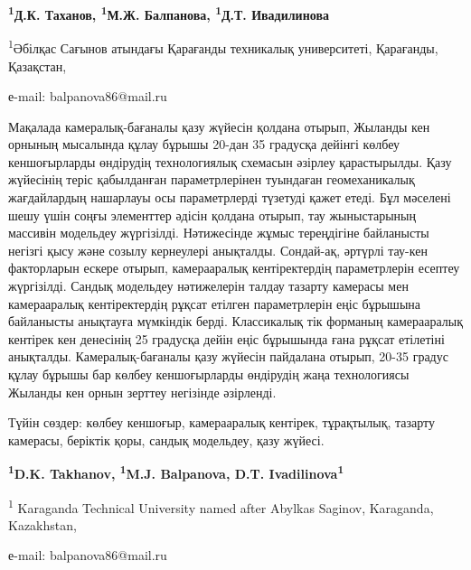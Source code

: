 \begin{center}
{\bfseries \textsuperscript{1}Д.К. Таханов, \textsuperscript{1}М.Ж.
Балпанова\envelope, \textsuperscript{1}Д.Т. Ивадилинова}

\textsuperscript{1}Әбілқас Сағынов атындағы Қарағанды техникалық
университеті, Қарағанды, Қазақстан,

е-mail: balpanova86@mail.ru
\end{center}

Мақалада камералық-бағаналы қазу жүйесін қолдана отырып, Жыланды кен
орнының мысалында құлау бұрышы 20-дан 35 градусқа дейінгі көлбеу
кеншоғырларды өндірудің технологиялық схемасын әзірлеу қарастырылды.
Қазу жүйесінің теріс қабылданған параметрлерінен туындаған
геомеханикалық жағдайлардың нашарлауы осы параметрлерді түзетуді қажет
етеді. Бұл мәселені шешу үшін соңғы элементтер әдісін қолдана отырып,
тау жыныстарының массивін модельдеу жүргізілді. Нәтижесінде жұмыс
тереңдігіне байланысты негізгі қысу және созылу кернеулері анықталды.
Сондай-ақ, әртүрлі тау-кен факторларын ескере отырып, камерааралық
кентіректердің параметрлерін есептеу жүргізілді. Сандық модельдеу
нәтижелерін талдау тазарту камерасы мен камерааралық кентіректердің
рұқсат етілген параметрлерін еңіс бұрышына байланысты анықтауға
мүмкіндік берді. Классикалық тік форманың камерааралық кентірек кен
денесінің 25 градусқа дейін еңіс бұрышында ғана рұқсат етілетіні
анықталды. Камералық-бағаналы қазу жүйесін пайдалана отырып, 20-35
градус құлау бұрышы бар көлбеу кеншоғырларды өндірудің жаңа технологиясы
Жыланды кен орнын зерттеу негізінде әзірленді.

Түйін сөздер: көлбеу кеншоғыр, камерааралық кентірек, тұрақтылық,
тазарту камерасы, беріктік қоры, сандық модельдеу, қазу жүйесі.


\begin{center}
{\bfseries \textsuperscript{1}D.K. Takhanov, \textsuperscript{1}M.J.
Balpanova\envelope, D.T. Ivadilinova\textsuperscript{1}}

\textsuperscript{1} Karaganda Technical University named after Abylkas
Saginov, Karaganda, Kazakhstan,

е-mail: balpanova86@mail.ru
\end{center}

